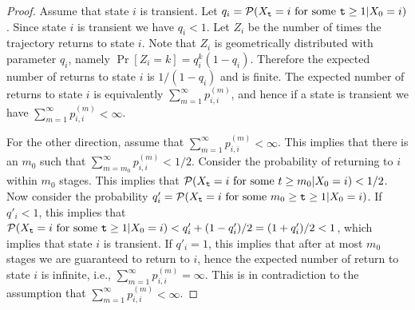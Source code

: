 \begin{proof}
Assume that state $i$ is transient. Let $q_i={\cal P}({X_{\tt t}} =
i{ \textrm{ for some }}{\tt t} \ge 1|{X_0} = i) $. Since state $i$ is
transient we have $q_i<1$. Let $Z_i$ be the number of times the
trajectory returns to state $i$. Note that $Z_i$ is geometrically
distributed with parameter $q_i$, namely $\Pr[Z_i=k]=q_i^k (1-q_i)$.
Therefore the expected number of returns to state $i$ is $1/(1-q_i)$
and is finite.
%
The expected number of returns to state $i$ is equivalently
$\sum\nolimits_{m = 1}^\infty {p_{i,i}^{(m)}} $, and hence if a
state is transient we have $\sum\nolimits_{m = 1}^\infty
{p_{i,i}^{(m)}}  < \infty $.

For the other direction, assume that $\sum\nolimits_{m = 1}^\infty
{p_{i,i}^{(m)}}  < \infty $. This implies that there is an $m_0$
such that $\sum\nolimits_{m = m_0}^\infty {p_{i,i}^{(m)}}  < 1/2$.
Consider the probability of returning to $i$ within $m_0$ stages.
This implies that ${\cal P}({X_{\tt t}} = i{ \textrm{ for some }}t
\ge m_0|{X_0} = i)< 1/2$. Now consider the probability $q'_i={\cal
P}({X_{\tt t}} = i{ \textrm{ for some }}m_0\geq {\tt t} \ge 1|{X_0} = i) $.
%
If $q'_i<1$, this implies that ${\cal P}({X_{\tt t}} = i{ \textrm{
for some }}{\tt t} \ge 1|{X_0} = i)<q'_i +(1-q'_i)/2=(1+q'_i)/2<1$, which
implies that state $i$ is transient.
%
If $q'_i=1$, this implies that after at most $m_0$ stages we are
guaranteed to return to $i$, hence the expected number of return to
state $i$ is infinite, i.e., $\sum\nolimits_{m = 1}^\infty
{p_{i,i}^{(m)}}  = \infty $. This is in contradiction to the
assumption that $\sum\nolimits_{m = 1}^\infty {p_{i,i}^{(m)}}  <
\infty $.
\end{proof}


